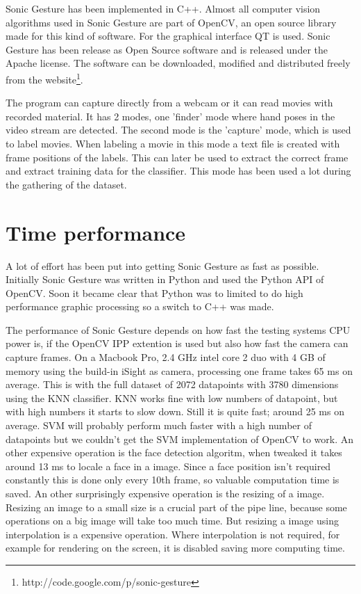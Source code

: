 Sonic Gesture has been implemented in C++. Almost all computer vision algorithms used in Sonic Gesture are part of OpenCV, an open source library made for this kind of software. For the graphical interface QT is used. Sonic Gesture has been release as Open Source software and is released under the Apache license. The software can be downloaded, modified and distributed freely from the website\footnote{http://code.google.com/p/sonic-gesture}.

The program can capture directly from a webcam or it can read movies with recorded material. It has 2 modes, one 'finder' mode where hand poses in the video stream are detected. The second mode is the 'capture' mode, which is used to label movies. When labeling a movie in this mode a text file is created with frame positions of the labels. This can later be used to extract the correct frame and extract training data for the classifier. This mode has been used a lot during the gathering of the dataset.

\section{Time performance}
A lot of effort has been put into getting Sonic Gesture as fast as possible. Initially Sonic Gesture was written in Python and used the Python API of OpenCV. Soon it became clear that Python was to limited to do high performance graphic processing so a switch to C++ was made. 

The performance of Sonic Gesture depends on how fast the testing systems CPU power is, if the OpenCV IPP extention is used but also how fast the camera can capture frames. On a Macbook Pro, 2.4 GHz intel core 2 duo with 4 GB of memory using the build-in iSight as camera, processing one frame takes 65 ms on average. This is with the full dataset of 2072 datapoints with 3780 dimensions using the KNN classifier. KNN works fine with low numbers of datapoint, but with high numbers it starts to slow down. Still it is quite fast; around 25 ms on average. SVM will probably perform much faster with a high number of datapoints but we couldn't get the SVM implementation of OpenCV to work. An other expensive operation is the face detection algoritm, when tweaked it takes around 13 ms to locale a face in a image. Since a face position isn't required constantly this is done only every 10th frame, so valuable computation time is saved. An other surprisingly expensive operation is the resizing of a image. Resizing an image to a small size is a crucial part of the pipe line, because some operations on a big image will take too much time. But resizing a image using interpolation is a expensive operation. Where interpolation is not required, for example for rendering on the screen, it is disabled saving more computing time. 



